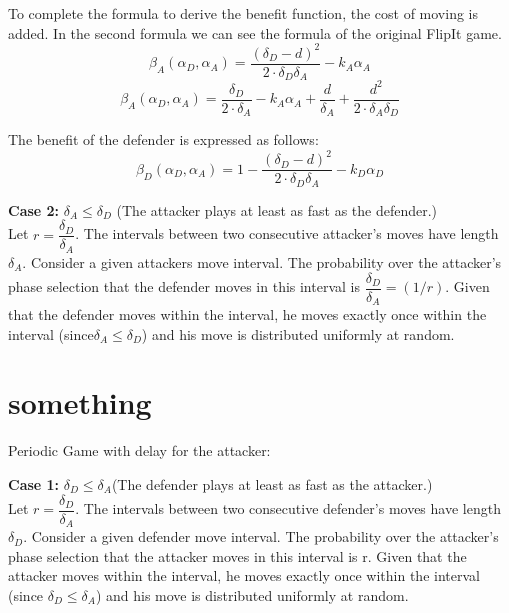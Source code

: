 To complete the formula to derive the benefit function, the cost of moving is added. In the second formula we can see the formula of the original FlipIt game.
\begin{equation}\label{first}
\beta_{A}(\alpha_{D},\alpha_{A}) = \dfrac { (\delta_{D}-d) ^{2}} {2 \cdot \delta_{D}  \delta_{A}} - k_{A} \alpha_{A}
\end{equation}
\begin{equation}\label{first}
\beta_{A}(\alpha_{D},\alpha_{A}) = \dfrac { \delta_{D}} {2 \cdot \delta_{A}} - k_{A} \alpha_{A} + \dfrac{d}{\delta_{A}} + \dfrac{d^{2}}{2 \cdot \delta_{A} \delta_{D}}
\end{equation}
 
 The benefit of the defender is expressed as follows:
 \begin{equation}\label{first}
\beta_{D}(\alpha_{D},\alpha_{A}) = 1 - \dfrac { (\delta_{D}-d) ^{2}} {2 \cdot \delta_{D}  \delta_{A}} - k_{D} \alpha_{D}
\end{equation}



\textbf{Case 2:} $\delta_{A} \leq \delta_{D} $ (The attacker plays at least as fast as the defender.) \\

Let $r = \dfrac{\delta_{D}}{ \delta_{A} }$. The intervals between two consecutive attacker's moves have length $\delta_{A}$. Consider a given attackers move interval. The probability over the attacker's phase selection that the defender moves in this interval is $\dfrac{\delta_{D}}{ \delta_{A} } = (1/r)$. Given that the defender moves within the interval, he moves exactly once within the interval (since$\delta_{A} \leq \delta_{D} $) and his move is distributed uniformly at random. \\


\section{something}
\label{Cha:9:inrto}



Periodic Game with delay for the attacker:

\textbf{Case 1:} $\delta_{D} \leq \delta_{A} $(The defender plays at least as fast as the attacker.) \\


Let $r = \dfrac{\delta_{D}}{ \delta_{A} }$. The intervals between two consecutive defender's moves have length $\delta_{D}$. Consider a given defender move interval. The probability over the attacker's phase selection that the attacker moves in this interval is r. Given that the attacker moves within the interval, he moves exactly once within the interval (since $\delta_{D} \leq \delta_{A} $) and his move is distributed uniformly at random. \\

